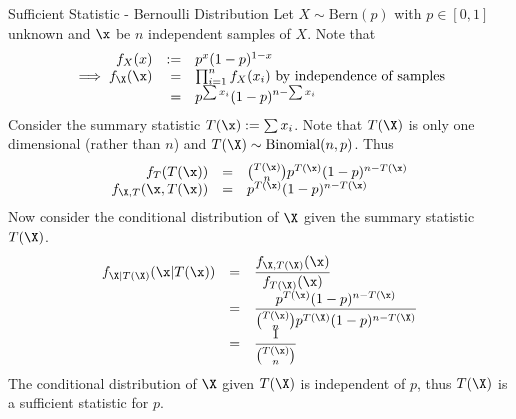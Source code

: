 \documentclass[11pt,a4paper]{article}
\begin{document}
  \begin{example}{Sufficient Statistic - Bernoulli Distribution}
    Let $X\sim\text{Bern}(p)$ with $p\in[0,1]$ unknown and $\x$ be $n$ independent samples of $X$. Note that
    \[\begin{array}{rrl}
      f_X(x)&:=&p^x(1-p)^{1-x}\\
      \implies f_\X(\x)&=&\prod_{i=1}^nf_X(x_i)\text{ by independence of samples}\\
      &=&p^{\sum x_i}(1-p)^{n-\sum x_i}
    \end{array}\]
    Consider the summary statistic $T(\x):=\sum x_i$. Note that $T(\X)$ is only one dimensional (rather than $n$) and ${T(\X)\sim\text{Binomial}(n,p)}$. Thus
    \[\begin{array}{rcl}
      f_T(T(\x))&=&{T(\x)\choose n}p^{T(\x)}(1-p)^{n-T(\x)}\\
      f_{\X,T}(\x,T(\x))&=&p^{T(\x)}(1-p)^{n-T(\x)}
    \end{array}\]
    Now consider the conditional distribution of $\X$ given the summary statistic $T(\X)$.
    \[\begin{array}{rcl}
      f_{\X|T(\X)}(\x|T(\x))&=&\dfrac{f_{\X,T(\X)}(\x)}{f_{T(\X)}(\x)}\\
      &=&\dfrac{p^{T(\x)}(1-p)^{n-T(\x)}}{{T(\x)\choose n}p^{T(\X)}(1-p)^{n-T(\X)}}\\
      &=&\dfrac1{{T(\x)\choose n}}
    \end{array}\]
    The conditional distribution of $\X$ given $T(\X)$ is independent of $p$, thus $T(\X)$ is a sufficient statistic for $p$.
  \end{example}
\end{document}
